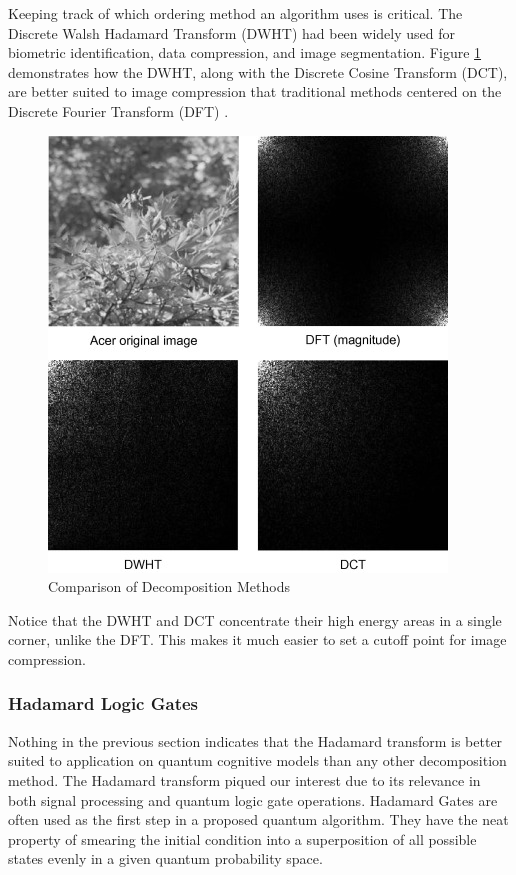Keeping track of which ordering method an algorithm uses is critical. The Discrete Walsh Hadamard Transform (DWHT) had been widely used for biometric identification, data compression, and image segmentation. Figure \ref{fig:comp} demonstrates how the DWHT, along with the Discrete Cosine Transform (DCT), are better suited to image compression that traditional methods centered on the Discrete Fourier Transform (DFT) \cite{bull2014communicating}.
\begin{figure}[]
    \centering
    \includegraphics[scale=0.7]{../../../figures/hada_example.jpg} 
    \caption{Comparison of Decomposition Methods}
    \label{fig:comp}
\end{figure}
Notice that the DWHT and DCT concentrate their high energy areas in a single corner, unlike the DFT. This makes it much easier to set a cutoff point for image compression. 
\subsubsection{Hadamard Logic Gates}
Nothing in the previous section indicates that the Hadamard transform is better suited to application on quantum cognitive models than any other decomposition method. The Hadamard transform piqued our interest due to its relevance in both signal processing and quantum logic gate operations. Hadamard Gates are often used as the first step in a proposed quantum algorithm. They have the neat property of smearing the initial condition into a superposition of all possible states evenly in a given quantum probability space.

